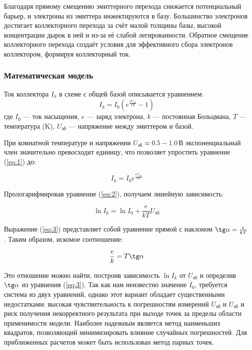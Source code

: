 Благодаря прямому смещению эмиттерного перехода снижается потенциальный барьер, и электроны из эмиттера инжектируются в базу. Большинство электронов достигает коллекторного перехода за счёт малой толщины базы, высокой концентрации дырок в ней и из-за её слабой легированности. Обратное смещение коллекторного перехода создаёт условия для эффективного сбора электронов коллектором, формируя коллекторный ток.

\subsubsection{Математическая модель}

Ток коллектора $I_k$ в схеме с общей базой описывается уравнением:
\begin{equation}
\label{eq:1}
   I_k = I_0 \left( e^{\frac{eU_{\text{эб}}}{kT}} - 1 \right)
\end{equation}
где $I_0$ — ток насыщения, $e$ — заряд электрона, $k$ — постоянная Больцмана, $T$ — температура (K), $U_{\text{эб}}$ — напряжение между эмиттером и базой.

При комнатной температуре и напряжении $U_{\text{эб}} \approx 0.5{-}1.0\,\text{В}$ экспоненциальный член значительно превосходит единицу, что позволяет упростить уравнение (\ref{eq:1}) до:

\begin{equation}
\label{eq:2}
   I_k = I_0e^{\frac{eU_{\text{эб}}}{kT}}
\end{equation}

Прологарифмировав уравнение (\ref{eq:2}), получаем линейную зависимость:

\begin{equation}
\label{eq:3}
   \ln I_k = \ln I_0 + \frac{e}{kT}U_{\text{эб}}
\end{equation}

Выражение (\ref{eq:3}) представляет собой уравнение прямой с наклоном $ \tg \alpha = \frac{e}{kT}$. Таким образом, искомое соотношение:

\begin{equation}
\label{eq:4}
   \frac{e}{k} = T \tg \alpha
\end{equation}

Это отношение можно найти, построив зависимость $\ln I_k$ от $U_{\text{эб}}$ и определив $\tg \alpha$ из уравнения (\ref{eq:3}). Так как нам неизвестно значение $I_0$, требуется система из двух уравнений, однако этот вариант обладает существенными недостатками: высокая чувствительность к погрешностям измерений $U_{\text{эб}}$ и $U_{\text{эб}}$ и риск получения некорректного результата при выходе точек за пределы области применимости модели. Наиболее надежным является метод наименьших квадратов, позволяющий минимизировать влияние случайных погрешностей. Для приближенных расчетов может быть использован метод парных точек.

